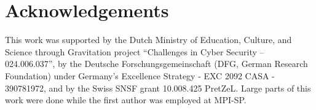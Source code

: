 \section*{Acknowledgements}
This work was supported
by the Dutch Ministry of Education, Culture, and Science through Gravitation project ``Challenges in Cyber Security -- 024.006.037'',
by the Deutsche Forschungsgemeinschaft (DFG, German Research Foundation) under Germany's Excellence Strategy - EXC 2092 CASA - 390781972, and by the Swiss SNSF grant 10.008.425 PretZeL.
Large parts of this work were done while the first author was employed at MPI-SP. 
